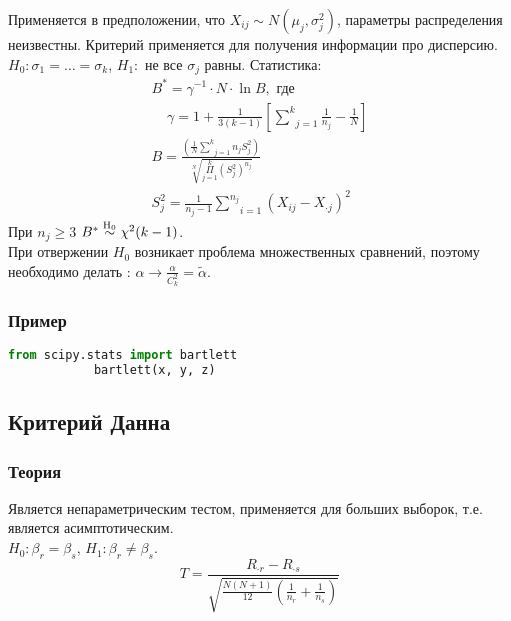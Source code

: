 		Применяется в предположении, что $X_{ij}\sim N (\mu_j, \sigma_j^2)$, параметры распределения неизвестны. Критерий применяется для получения информации про дисперсию.\\

		$H_0: \sigma_1 = \dots = \sigma_k$, $H_1:$ не все $\sigma_j$ равны. Статистика:
		$$\begin{gathered}
			B^{*} = \gamma^{-1} \cdot N \cdot \ln B, \text{ где}\\
			\;\;\;\; \gamma = 1 + \frac{1}{3(k-1)} \left[ \underset{j=1}{\overset{k}{\sum}}\frac{1}{n_j} - \frac{1}{N} \right] \\
			B = \frac{\left( \frac{1}{N} \underset{j=1}{\overset{k}{\sum}}n_j S_j^2 \right)}{\sqrt[N]{\underset{j=1}{\overset{k}{\Pi}} (S_j^2)^{n_j}}} \\
			S_j^2 = \frac{1}{n_j - 1} \underset{i=1}{\overset{n_j}{\sum}}(X_{ij} - X_{\cdot j})^2
		\end{gathered}$$
		При $n_j \ge 3$ $B^{*} \mathrel{\stackrel{\rm H_0}\sim} \chi^2 (k-1)$.\\

		При отвержении $H_0$ возникает проблема множественных сравнений, поэтому необходимо делать : $\alpha \to \frac{\alpha}{C_k^2} = \tilde{\alpha}$.

		\subsubsection*{Пример}\label{cha:uniform/sec:k/subsec:bartlet/subsubsec:prob}

		\begin{lstlisting}[language=Python]
			from scipy.stats import bartlett
			bartlett(x, y, z)
		\end{lstlisting}

	\subsection{Критерий Данна}\label{cha:uniform/sec:k/dann}

		\subsubsection*{Теория}\label{cha:uniform/sec:k/subsec:dann/subsubsec:theory}

		Является непараметрическим тестом, применяется для больших выборок, т.е. является асимптотическим.\\

		$H_0: \beta_r = \beta_s$, $H_1: \beta_r \not = \beta_s$.
		$$T = \frac{R_{\cdot r} - R_{\cdot s}}{\sqrt{\frac{N(N+1)}{12}\left( \frac{1}{n_r} + \frac{1}{n_s} \right)}}$$

